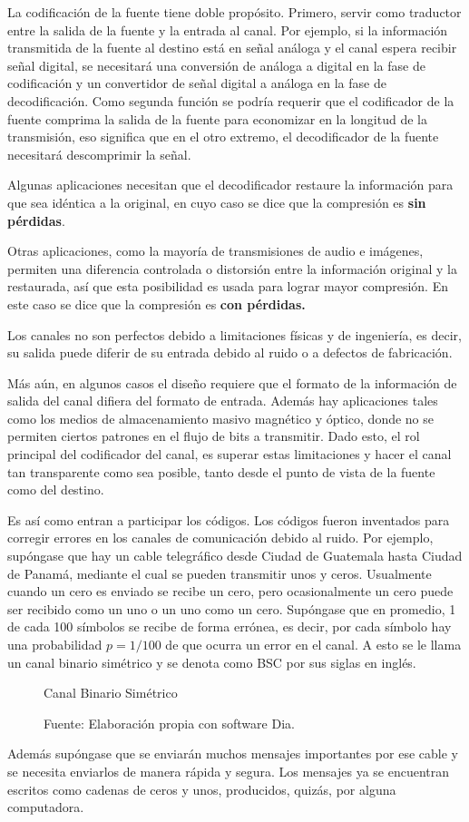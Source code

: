 La codificación de la fuente tiene doble propósito. Primero, servir como traductor entre la salida de la fuente y la entrada al canal. Por ejemplo, si la información transmitida de la fuente al destino está en señal análoga y el canal espera recibir señal digital, se necesitará una conversión de análoga a digital en la fase de codificación y un convertidor de señal digital a análoga en la fase de decodificación. Como segunda función se podría requerir que el codificador de la fuente comprima la salida de la fuente para economizar en la longitud de la transmisión, eso significa que en el otro extremo, el decodificador de la fuente necesitará descomprimir la señal.

Algunas aplicaciones necesitan que el decodificador restaure la información para que sea idéntica a la original, en cuyo caso se dice que la compresión es \textbf{sin pérdidas}.

Otras aplicaciones, como la mayoría de transmisiones de audio e imágenes, permiten una diferencia controlada o distorsión entre la información original y la restaurada, así que esta posibilidad es usada para lograr mayor compresión. En este caso se dice que la compresión es \textbf{con pérdidas.}

Los canales no son perfectos debido a limitaciones físicas y de ingeniería, es decir, su salida puede diferir de su entrada debido al ruido o a defectos de fabricación.

Más aún, en algunos casos el diseño requiere que el formato de la información de salida del canal difiera del formato de entrada. Además hay aplicaciones tales como los medios de almacenamiento masivo magnético y óptico, donde no se permiten ciertos patrones en el flujo de bits a transmitir. Dado esto, el rol principal del codificador del canal, es superar estas limitaciones y hacer el canal tan transparente  como sea posible, tanto desde el punto de vista de la fuente como del destino. 

Es así como entran a participar los códigos. Los códigos fueron inventados para corregir errores en los canales de comunicación debido al ruido. Por ejemplo, supóngase que hay un cable telegráfico desde Ciudad de Guatemala hasta Ciudad de Panamá, mediante el cual se pueden transmitir unos y ceros. Usualmente cuando un cero es enviado se recibe un cero, pero ocasionalmente un cero puede ser recibido como un uno o un uno como un cero. Supóngase que en promedio, 1 de cada 100 símbolos se recibe de forma errónea, es decir, por cada símbolo hay una probabilidad $p=1/100$ de que ocurra un error en el canal. A esto se le llama un canal binario simétrico y se denota como BSC por sus siglas en inglés.
\begin{figure}
\centering
\caption{Canal Binario Simétrico}

\caption*{Fuente: Elaboración propia con software Dia.}
\label{fig:CBS}
\end{figure} 
Además supóngase que se enviarán muchos mensajes importantes por ese cable y se necesita enviarlos de manera rápida y segura. Los mensajes ya se encuentran escritos como cadenas de ceros y unos, producidos, quizás, por alguna computadora.


